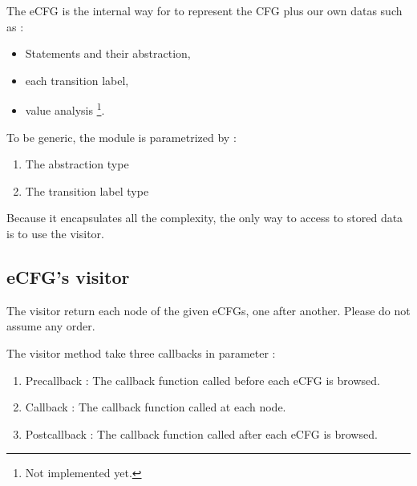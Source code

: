 The \gls{eCFG} is the internal way for \flatac to represent the  
\gls{CFG} plus our own datas such as :
\begin{itemize}
  \item Statements and their abstraction,
  \item each transition label,
  \item value analysis \footnote{Not implemented yet.}.
\end{itemize}

To be generic, the module is parametrized by :
\begin{enumerate}
  \item The abstraction type
  \item The transition label type
\end{enumerate}


Because it encapsulates all the complexity, the only way to access to 
stored data is to use the visitor.

\subsection{eCFG's visitor}
The visitor return each node of the given eCFGs, one after another. Please do 
not assume any order.

The visitor method take three callbacks in parameter :
\begin{enumerate}
  \item Precallback : The callback function called before each \gls{eCFG} is 
    browsed.
  \item Callback : The callback function called at each node.
  \item Postcallback : The callback function called after each \gls{eCFG} is 
    browsed.
\end{enumerate}
